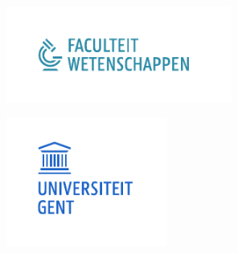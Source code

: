\documentclass{article}
\begin{document}
\includegraphics[width=74mm]{verslag/logo-we.pdf}

\includegraphics[width=53mm]{verslag/logo-ugent.pdf}
\end{document}
